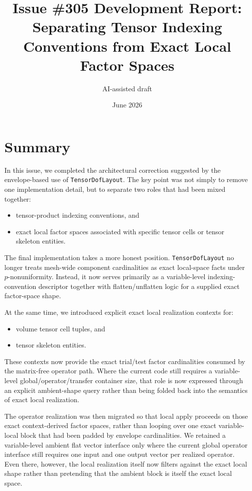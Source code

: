 \documentclass[11pt]{article}
\title{Issue \#305 Development Report: Separating Tensor Indexing Conventions from Exact Local Factor Spaces}
\author{AI-assisted draft}
\date{June 2026}
\begin{document}
\maketitle

\section{Summary}

In this issue, we completed the architectural correction suggested by the envelope-based use of \texttt{TensorDofLayout}.  The key point was not simply to remove one implementation detail, but to separate two roles that had been mixed together:
\begin{itemize}[leftmargin=*]
  \item tensor-product indexing conventions, and
  \item exact local factor spaces associated with specific tensor cells or tensor skeleton entities.
\end{itemize}

The final implementation takes a more honest position.  \texttt{TensorDofLayout} no longer treats mesh-wide component cardinalities as exact local-space facts under \(p\)-nonuniformity.  Instead, it now serves primarily as a variable-level indexing-convention descriptor together with flatten/unflatten logic for a supplied exact factor-space shape.

At the same time, we introduced explicit exact local realization contexts for:
\begin{itemize}[leftmargin=*]
  \item volume tensor cell tuples, and
  \item tensor skeleton entities.
\end{itemize}
These contexts now provide the exact trial/test factor cardinalities consumed by the matrix-free operator path.  Where the current code still requires a variable-level global/operator/transfer container size, that role is now expressed through an explicit ambient-shape query rather than being folded back into the semantics of exact local realization.

The operator realization was then migrated so that local apply proceeds on those exact context-derived factor spaces, rather than looping over one exact variable-local block that had been padded by envelope cardinalities.  We retained a variable-level ambient flat vector interface only where the current global operator interface still requires one input and one output vector per realized operator.  Even there, however, the local realization itself now filters against the exact local shape rather than pretending that the ambient block is itself the exact local space.
\end{document}
